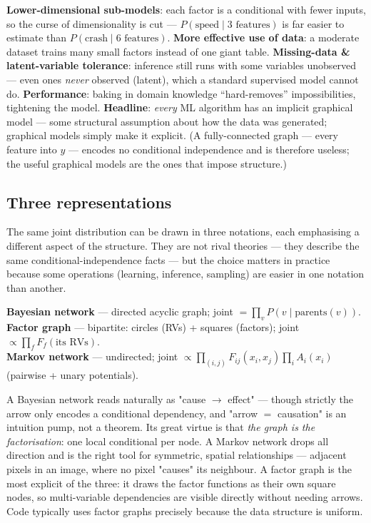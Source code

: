 \documentclass[11pt, a4paper]{article}
\newcommand{\kw}[1]{\textbf{#1}}
\begin{document}
\begin{notebox}
\kw{Lower-dimensional sub-models}: each factor is a conditional with fewer inputs, so the curse of
dimensionality is cut — $P(\text{speed}\mid\text{3 features})$ is far easier to estimate than
$P(\text{crash}\mid\text{6 features})$. \kw{More effective use of data}: a moderate dataset trains
many small factors instead of one giant table. \kw{Missing-data \& latent-variable tolerance}:
inference still runs with some variables unobserved — even ones \emph{never} observed (latent),
which a standard supervised model cannot do. \kw{Performance}: baking in domain knowledge
``hard-removes'' impossibilities, tightening the model. \kw{Headline}: \emph{every} ML algorithm has
an implicit graphical model — some structural assumption about how the data was generated; graphical
models simply make it explicit. (A fully-connected graph — every feature into $y$ — encodes no
conditional independence and is therefore useless; the useful graphical models are the ones that
impose structure.)
\end{notebox}

\subsection{Three representations}

The same joint distribution can be drawn in three notations, each emphasising a different aspect of
the structure. They are not rival theories — they describe the same conditional-independence facts —
but the choice matters in practice because some operations (learning, inference, sampling) are
easier in one notation than another.

\begin{defbox}
\kw{Bayesian network} — directed acyclic graph; joint $=\prod_v P(v\mid\text{parents}(v))$. \\
\kw{Factor graph} — bipartite: circles (RVs) + squares (factors); joint $\propto\prod_f F_f(\text{its RVs})$. \\
\kw{Markov network} — undirected; joint $\propto\prod_{(i,j)}F_{ij}(x_i,x_j)\prod_i A_i(x_i)$
(pairwise + unary potentials).
\end{defbox}

A Bayesian network reads naturally as "cause $\to$ effect" — though strictly the arrow only encodes a
conditional dependency, and "arrow $=$ causation" is an intuition pump, not a theorem. Its great
virtue is that \emph{the graph is the factorisation}: one local conditional per node. A Markov
network drops all direction and is the right tool for symmetric, spatial relationships — adjacent
pixels in an image, where no pixel "causes" its neighbour. A factor graph is the most explicit of
the three: it draws the factor functions as their own square nodes, so multi-variable dependencies
are visible directly without needing arrows. Code typically uses factor graphs precisely because the
data structure is uniform.
\end{document}
